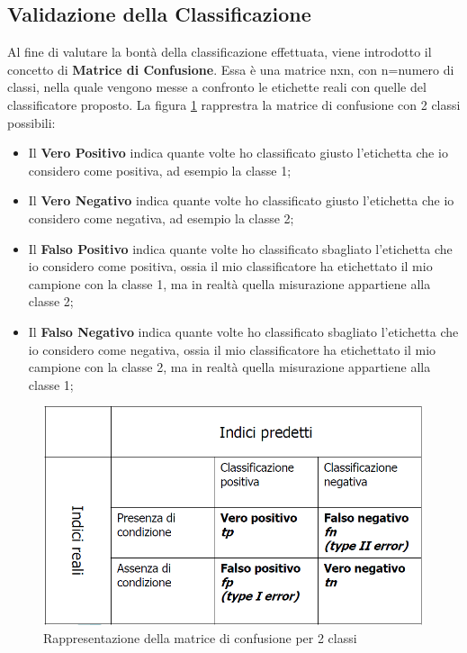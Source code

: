 \subsection{Validazione della Classificazione}
Al fine di valutare la bontà della classificazione effettuata, viene introdotto il concetto di \textbf{Matrice di Confusione}. Essa è una matrice nxn, con n=numero di classi, nella quale vengono messe a confronto le etichette reali con quelle del classificatore proposto. La figura \ref{immagine_matrice_confusione_2classi}  rapprestra la matrice di confusione con 2 classi possibili:
\begin{itemize}
	\item Il \textbf{Vero Positivo} indica quante volte ho classificato giusto l'etichetta che io considero come positiva, ad esempio la classe 1;
	\item Il \textbf{Vero Negativo} indica quante volte ho classificato giusto l'etichetta che io considero come negativa, ad esempio la classe 2;
	\item Il \textbf{Falso Positivo} indica quante volte ho classificato sbagliato l'etichetta che io considero come positiva, ossia il mio classificatore ha etichettato il mio campione con la classe 1, ma in realtà quella misurazione appartiene alla classe 2;
	\item Il \textbf{Falso Negativo} indica quante volte ho classificato sbagliato l'etichetta che io considero come negativa, ossia il mio classificatore ha etichettato il mio campione con la classe 2, ma in realtà quella misurazione appartiene alla classe 1;
\end{itemize}
\begin{figure}[h!]
	\centering
	\includegraphics[width=1\textwidth]{images/matrice_confusione.png}
	\caption{Rappresentazione della matrice di confusione per 2 classi}
	\label{immagine_matrice_confusione_2classi}
\end{figure}
